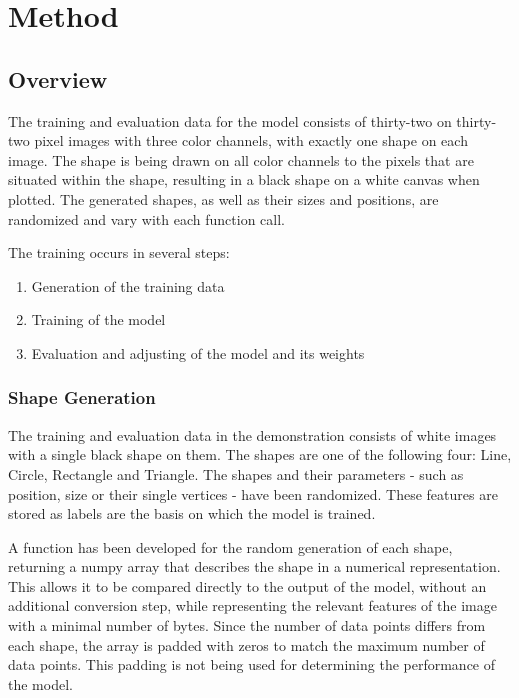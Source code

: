 \documentclass[12pt, a4paper, titlepage]{report}
\begin{document}



\chapter{Method}

\section{Overview}

The training and evaluation data for the model consists of thirty-two on thirty-two pixel images with three color channels, with exactly one shape on each image. The shape is being drawn on all color channels to the pixels that are situated within the shape, resulting in a black shape on a white canvas when plotted.
The generated shapes, as well as their sizes and positions, are randomized and vary with each function call.

\vspace{0.2cm}
The training occurs in several steps:

\begin{enumerate}[label=\Roman*.]
   \item Generation of the training data
   \item Training of the model
   \item Evaluation and adjusting of the model and its weights
\end{enumerate}


\subsection{Shape Generation}

The training and evaluation data in the demonstration consists of white images with a single black shape on them. The shapes are one of the following four: Line, Circle, Rectangle and Triangle. The shapes and their parameters - such as position, size or their single vertices - have been randomized. These features are stored as labels are the basis on which the model is trained.

A function has been developed for the random generation of each shape, returning a numpy array that describes the shape in a numerical representation. This allows it to be compared directly to the output of the model, without an additional conversion step, while representing the relevant features of the image with a minimal number of bytes. Since the number of data points differs from each shape, the array is padded with zeros to match the maximum number of data points. This padding is not being used for determining the performance of the model.
\end{document}
